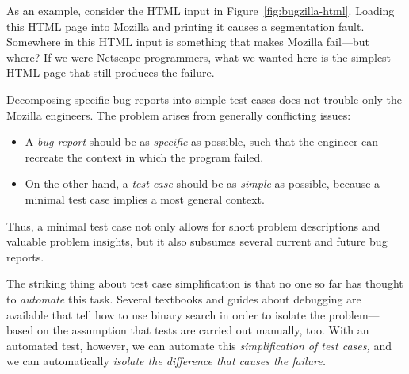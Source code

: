 \documentclass{acm_proc_article-sp}
\newcommand{\HTML}       {{\small HTML}\xspace}
\theoremstyle{plain}
\begin{document}
As an example, consider the \HTML input in
Figure~\ref{fig:bugzilla-html}.  Loading this \HTML page into Mozilla
and printing it causes a segmentation fault.  Somewhere in this \HTML
input is something that makes Mozilla fail---but where?  If we were
Netscape programmers, what we wanted here is the simplest \HTML page
that still produces the failure.

Decomposing specific bug reports into simple test cases does not
trouble only the Mozilla engineers.  The problem arises from generally
conflicting issues:
\begin{itemize}
\item A \emph{bug report} should be as \emph{specific} as possible, such that
  the engineer can recreate the context in which the program failed.
\item On the other hand, a \emph{test case} should be as \emph{simple}
  as possible, because a minimal test case implies a most general
  context.
\end{itemize}
Thus, a minimal test case not only allows for short problem
descriptions and valuable problem insights, but it also subsumes
several current and future bug reports.

The striking thing about test case simplification is that no one so
far has thought to \emph{automate} this task.  Several textbooks and
guides about debugging are available that tell how to use binary
search in order to isolate the problem---based on the assumption that
tests are carried out manually, too.  With an automated test, however,
we can automate this \emph{simplification of test cases,} and we can
automatically \emph{isolate the difference that causes the failure.}
\end{document}
